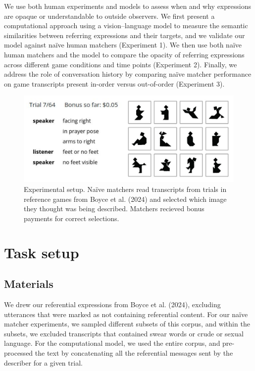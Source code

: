\documentclass[10pt, letterpaper]{article}
\begin{document}
We use both human experiments and models to assess when and why
expressions are opaque or understandable to outside observers. We first
present a computational approach using a vision--language model to
measure the semantic similarities between referring expressions and
their targets, and we validate our model against naïve human matchers
(Experiment 1). We then use both naïve human matchers and the model to
compare the opacity of referring expressions across different game
conditions and time points (Experiment 2). Finally, we address the role
of conversation history by comparing naïve matcher performance on game
transcripts present in-order versus out-of-order (Experiment 3).

\begin{CodeChunk}
\begin{figure}[t!]

{\centering \includegraphics[width=1\linewidth]{matcher-diagram} 

}

\caption[Experimental setup]{Experimental setup. Naïve matchers read transcripts from trials in reference games from Boyce et al. (2024) and selected which image they thought was being described. Matchers recieved bonus payments for correct selections. \label{game}}\label{fig:interface}
\end{figure}
\end{CodeChunk}

\section{Task setup}\label{task-setup}

\subsection{Materials}\label{materials}

We drew our referential expressions from Boyce et al. (2024), excluding
utterances that were marked as not containing referential content. For
our naïve matcher experiments, we sampled different subsets of this
corpus, and within the subsets, we excluded transcripts that contained
swear words or crude or sexual language. For the computational model, we
used the entire corpus, and pre-processed the text by concatenating all
the referential messages sent by the describer for a given trial.
\end{document}
